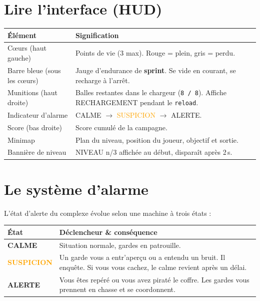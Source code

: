 \documentclass[11pt,a4paper]{article}
\newcommand{\code}[1]{\colorbox{codebg}{\texttt{#1}}}
\begin{document}
\section{Lire l'interface (HUD)}
\begin{center}
\begin{tabular}{@{}p{4.2cm}p{10cm}@{}}
\toprule
\textbf{\'El\'ement} & \textbf{Signification} \\
\midrule
Cœurs (haut gauche)        & Points de vie (3 max). Rouge = plein, gris = perdu. \\
Barre bleue (sous les cœurs) & Jauge d'endurance de \textbf{sprint}. Se vide en courant, se recharge \`a l'arr\^et. \\
Munitions (haut droite)    & Balles restantes dans le chargeur (\code{8 / 8}). Affiche \og{}RECHARGEMENT\fg{} pendant le \texttt{reload}. \\
Indicateur d'alarme        & \textcolor{eclipsegreen}{CALME} $\rightarrow$ \textcolor{orange}{SUSPICION} $\rightarrow$ \textcolor{eclipsered}{ALERTE}. \\
Score (bas droite)         & Score cumul\'e de la campagne. \\
Minimap                    & Plan du niveau, position du joueur, objectif et sortie. \\
Banni\`ere de niveau       & \og{}NIVEAU n/3\fg{} affich\'ee au d\'ebut, dispara\^it apr\`es 2\,s. \\
\bottomrule
\end{tabular}
\end{center}

\section{Le syst\`eme d'alarme}
L'\'etat d'alerte du complexe \'evolue selon une machine \`a trois \'etats :

\begin{center}
\begin{tabular}{@{}lp{10cm}@{}}
\toprule
\textbf{\'Etat} & \textbf{D\'eclencheur \&{} cons\'equence} \\
\midrule
\textcolor{eclipsegreen}{\textbf{CALME}}     & Situation normale, gardes en patrouille. \\
\textcolor{orange}{\textbf{SUSPICION}} & Un garde vous a entr'aper\c{c}u ou a entendu un bruit. Il enqu\^ete. Si vous vous cachez, le calme revient apr\`es un d\'elai. \\
\textcolor{eclipsered}{\textbf{ALERTE}}      & Vous \^etes rep\'er\'e ou vous avez pirat\'e le coffre. Les gardes vous prennent en chasse et se coordonnent. \\
\bottomrule
\end{tabular}
\end{center}
\end{document}
